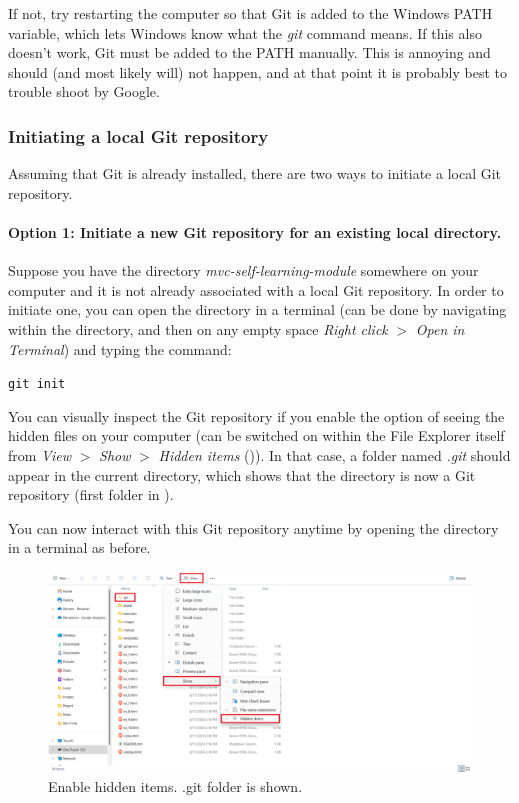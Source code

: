 \documentclass[a4paper,10pt]{article}
\begin{document}
If not, try restarting the computer so that Git is added to the Windows PATH variable, which lets Windows know what the \emph{git} command means. If this also doesn't work, Git must be added to the PATH manually. This is annoying and should (and most likely will) not happen, and at that point it is probably best to trouble shoot by Google.

\subsubsection{Initiating a local Git repository}
\label{git_init}

Assuming that Git is already installed, there are two ways to initiate a local Git repository.

\paragraph{Option 1: Initiate a new Git repository for an existing local directory.} Suppose you have the directory \emph{mvc-self-learning-module} somewhere on your computer and it is not already associated with a local Git repository. In order to initiate one, you can open the directory in a terminal (can be done by navigating within the directory, and then on any empty space \emph{Right click} $>$ \emph{Open in Terminal}) and typing the command: 

\texttt{git init}

You can visually inspect the Git repository if you enable the option of seeing the hidden files on your computer (can be switched on within the File Explorer itself from \emph{View} $>$ \emph{Show} $>$ \emph{Hidden items} ()). In that case, a folder named \emph{.git} should appear in the current directory, which shows that the directory is now a Git repository (first folder in ). 

You can now interact with this Git repository anytime by opening the directory in a terminal as before.

\begin{figure}[htbp]
    \centering
    \includegraphics[width=\textwidth]{hidden_items.png}
    \caption{Enable hidden items. .git folder is shown.}
    \label{hidden_items}   
\end{figure}
\end{document}
